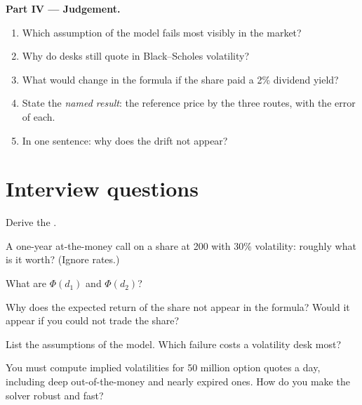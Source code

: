 \begin{problem}
\medskip\noindent\textbf{Part IV --- Judgement.}
\begin{enumerate}[resume]
\item Which assumption of the model fails most visibly in the market?
\item Why do desks still quote in Black--Scholes volatility?
\item What would change in the formula if the share paid a 2\% dividend yield?
\item State the \emph{named result}: the reference price by the three routes, with the
error of each.
\item In one sentence: why does the drift not appear?
\end{enumerate}
\end{problem}

\section{Interview questions}

\begin{interviewq}\label{iq:dv:black-scholes-three-ways:1}
Derive the .
\end{interviewq}

\begin{interviewq}\label{iq:dv:black-scholes-three-ways:2}
A one-year at-the-money call on a share at 200 with 30\% volatility: roughly
what is it worth? (Ignore rates.)
\end{interviewq}

\begin{interviewq}\label{iq:dv:black-scholes-three-ways:3}
What are $\Phi(d_1)$ and $\Phi(d_2)$?
\end{interviewq}

\begin{interviewq}\label{iq:dv:black-scholes-three-ways:4}
Why does the expected return of the share not appear in the formula? Would
it appear if you could not trade the share?
\end{interviewq}

\begin{interviewq}\label{iq:dv:black-scholes-three-ways:5}
List the assumptions of the model. Which failure costs a volatility desk most?
\end{interviewq}

\begin{interviewq}\label{iq:dv:black-scholes-three-ways:6}
You must compute implied volatilities for 50 million option quotes a day,
including deep out-of-the-money and nearly expired ones. How do you make the
solver robust and fast?
\end{interviewq}
